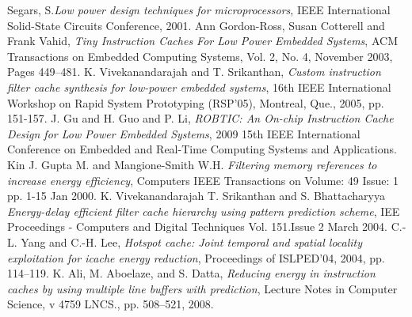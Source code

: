 \documentclass[conference]{IEEEtran}
\begin{document}


%
%
%






%
%
%
\begin{thebibliography}{5}
Segars, S.\emph{Low power design techniques for microprocessors}, IEEE International Solid-State Circuits Conference, 2001. 
Ann Gordon-Ross, Susan Cotterell and Frank Vahid, \emph{Tiny Instruction Caches For Low Power Embedded Systems}, ACM Transactions on Embedded Computing Systems, Vol. 2, No. 4, November 2003, Pages 449–481.
K. Vivekanandarajah and T. Srikanthan, \emph{Custom instruction filter cache synthesis for low-power embedded systems}, 16th IEEE International Workshop on Rapid System Prototyping (RSP'05), Montreal, Que., 2005, pp. 151-157.
J. Gu and H. Guo and P. Li, \emph{ROBTIC: An On-chip Instruction Cache Design for Low Power Embedded Systems}, 2009 15th IEEE International Conference on Embedded and Real-Time Computing Systems and Applications.
Kin J. Gupta M. and Mangione-Smith W.H.  \emph{Filtering memory references to increase energy efficiency}, Computers IEEE Transactions on Volume: 49 Issue: 1 pp. 1-15 Jan 2000.
K. Vivekanandarajah T. Srikanthan and S. Bhattacharyya \emph{Energy-delay efficient filter cache hierarchy using pattern prediction scheme}, IEE Proceedings - Computers and Digital Techniques Vol. 151.Issue 2 March 2004.
C.-L. Yang and C.-H. Lee, \emph{Hotspot cache: Joint temporal and spatial
locality exploitation for icache energy reduction}, Proceedings of
ISLPED’04, 2004, pp. 114–119.
K. Ali, M. Aboelaze, and S. Datta, \emph{Reducing energy in instruction caches
by using multiple line buffers with prediction}, Lecture Notes in Computer
Science, v 4759 LNCS., pp. 508–521, 2008.
\end{thebibliography}




\end{document}
